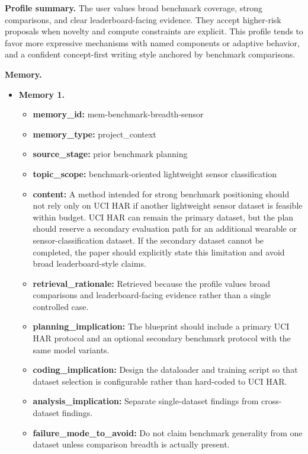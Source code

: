 \documentclass{opendatalab}
\begin{document}
\begin{tcolorbox}
\textbf{Profile summary.}\;
The user values broad benchmark coverage, strong comparisons, and clear leaderboard-facing evidence. They accept higher-risk proposals when novelty and compute constraints are explicit. This profile tends to favor more expressive mechanisms with named components or adaptive behavior, and a confident concept-first writing style anchored by benchmark comparisons.

\medskip
\textbf{Memory.}
\begin{itemize}\setlength\itemsep{2pt}
  \item \textbf{Memory 1.}
  \begin{itemize}\setlength\itemsep{1pt}
    \item \textbf{memory\_id:} mem-benchmark-breadth-sensor
    \item \textbf{memory\_type:} project\_context
    \item \textbf{source\_stage:} prior benchmark planning
    \item \textbf{topic\_scope:} benchmark-oriented lightweight sensor classification
    \item \textbf{content:} A method intended for strong benchmark positioning should not rely only on UCI HAR if another lightweight sensor dataset is feasible within budget. UCI HAR can remain the primary dataset, but the plan should reserve a secondary evaluation path for an additional wearable or sensor-classification dataset. If the secondary dataset cannot be completed, the paper should explicitly state this limitation and avoid broad leaderboard-style claims.
    \item \textbf{retrieval\_rationale:} Retrieved because the profile values broad comparisons and leaderboard-facing evidence rather than a single controlled case.
    \item \textbf{planning\_implication:} The blueprint should include a primary UCI HAR protocol and an optional secondary benchmark protocol with the same model variants.
    \item \textbf{coding\_implication:} Design the dataloader and training script so that dataset selection is configurable rather than hard-coded to UCI HAR.
    \item \textbf{analysis\_implication:} Separate single-dataset findings from cross-dataset findings.
    \item \textbf{failure\_mode\_to\_avoid:} Do not claim benchmark generality from one dataset unless comparison breadth is actually present.
  \end{itemize}


\end{itemize}
\end{tcolorbox}
\end{document}
